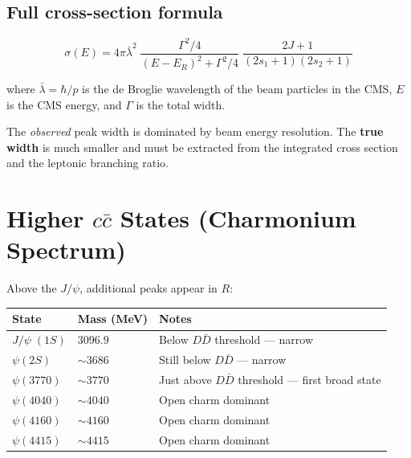 \subsection{Full cross-section formula}

\[
  \sigma(E) = 4\pi\bar{\lambda}^2
  \;\frac{\Gamma^2/4}{\left(E - E_R\right)^2 + \Gamma^2/4}
  \;\frac{2J+1}{(2s_1+1)(2s_2+1)}
\]

where $\bar{\lambda} = \hbar/p$ is the de Broglie wavelength of the beam particles in
the CMS, $E$ is the CMS energy, and $\Gamma$ is the total width.

\begin{notebox}
   The \emph{observed} peak width is dominated by beam energy
  resolution. The \textbf{true width} is much smaller and must be extracted from the
  integrated cross section and the leptonic branching ratio.
\end{notebox}

\section{Higher \texorpdfstring{$c\bar{c}$}{ccbar} States (Charmonium Spectrum)}

Above the $J/\psi$, additional peaks appear in $R$:

\vspace{6pt}
\begin{center}
\begin{tabular}{C{2.8cm} C{2.8cm} L{6cm}}
  \toprule
  \color{white}\textbf{State} &
  \color{white}\textbf{Mass (MeV)} &
  \color{white}\textbf{Notes} \\
  \midrule
  $J/\psi\;(1S)$ & $3096.9$ & Below $D\bar{D}$ threshold --- narrow \\
  $\psi(2S)$     & $\sim 3686$ & Still below $D\bar{D}$ --- narrow \\
  $\psi(3770)$   & $\sim 3770$ & Just above $D\bar{D}$ threshold --- first broad state \\
  $\psi(4040)$   & $\sim 4040$ & Open charm dominant \\
  $\psi(4160)$   & $\sim 4160$ & Open charm dominant \\
  $\psi(4415)$   & $\sim 4415$ & Open charm dominant \\
  \bottomrule
\end{tabular}
\end{center}
\vspace{6pt}


